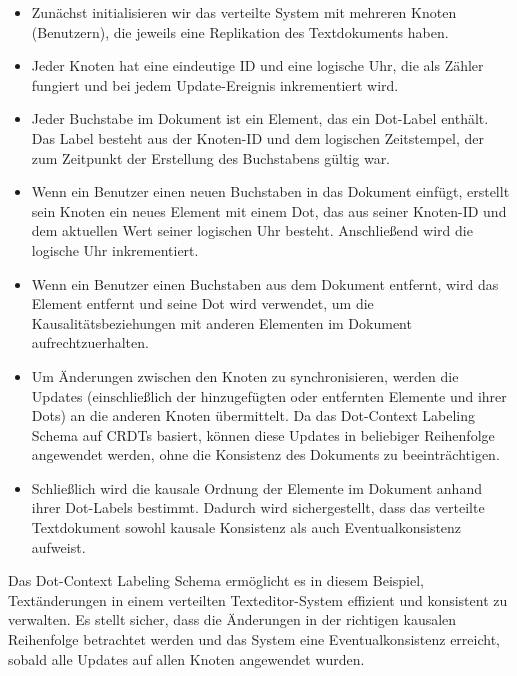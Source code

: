 \documentclass[../vs-script-first-v01.tex]{subfiles}
\begin{document}
\begin{itemize}
\item Zunächst initialisieren wir das verteilte System mit mehreren Knoten (Benutzern), die jeweils eine Replikation des Textdokuments haben.
\item Jeder Knoten hat eine eindeutige ID und eine logische Uhr, die als Zähler fungiert und bei jedem Update-Ereignis inkrementiert wird.
\item Jeder Buchstabe im Dokument ist ein Element, das ein Dot-Label enthält. Das Label besteht aus der Knoten-ID und dem logischen Zeitstempel, der zum Zeitpunkt der Erstellung des Buchstabens gültig war.
\item Wenn ein Benutzer einen neuen Buchstaben in das Dokument einfügt, erstellt sein Knoten ein neues Element mit einem Dot, das aus seiner Knoten-ID und dem aktuellen Wert seiner logischen Uhr besteht. Anschließend wird die logische Uhr inkrementiert.
\item Wenn ein Benutzer einen Buchstaben aus dem Dokument entfernt, wird das Element entfernt und seine Dot wird verwendet, um die Kausalitätsbeziehungen mit anderen Elementen im Dokument aufrechtzuerhalten.
\item Um Änderungen zwischen den Knoten zu synchronisieren, werden die Updates (einschließlich der hinzugefügten oder entfernten Elemente und ihrer Dots) an die anderen Knoten übermittelt. Da das Dot-Context Labeling Schema auf CRDTs basiert, können diese Updates in beliebiger Reihenfolge angewendet werden, ohne die Konsistenz des Dokuments zu beeinträchtigen.
\item Schließlich wird die kausale Ordnung der Elemente im Dokument anhand ihrer Dot-Labels bestimmt. Dadurch wird sichergestellt, dass das verteilte Textdokument sowohl kausale Konsistenz als auch Eventualkonsistenz aufweist.
\end{itemize}
Das Dot-Context Labeling Schema ermöglicht es in diesem Beispiel, Textänderungen in einem verteilten Texteditor-System effizient und konsistent zu verwalten. Es stellt sicher, dass die Änderungen in der richtigen kausalen Reihenfolge betrachtet werden und das System eine Eventualkonsistenz erreicht, sobald alle Updates auf allen Knoten angewendet wurden.
\end{document}
